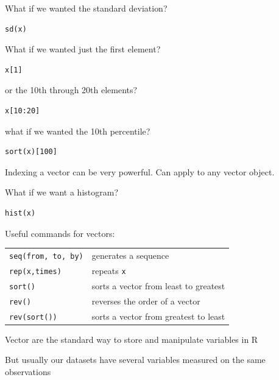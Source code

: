 \documentclass[pdflatex,landscape,titlepage]{foils}
\begin{document}
What if we wanted the standard deviation?

\begin{verbatim}
sd(x)
\end{verbatim}


What if we wanted just the first element?

\begin{verbatim}
x[1]
\end{verbatim}

or the 10th through 20th elements?

\begin{verbatim}
x[10:20]
\end{verbatim}

what if we wanted the 10th percentile?

\begin{verbatim}
sort(x)[100]
\end{verbatim}

Indexing a vector can be very powerful.  Can apply to any vector object.

What if we want a histogram?

\begin{verbatim}
hist(x)
\end{verbatim}


Useful commands for vectors:

\begin{tabular}{ll}
\texttt{seq(from, to, by)} &generates a sequence\\

\texttt{rep(x,times)} &repeats \texttt{x} \\

\texttt{sort()} &sorts a vector from least to greatest\\
  
\texttt{rev()} &reverses the order of a vector\\

\texttt{rev(sort())} &sorts a vector from greatest to least\\
\end{tabular}




Vector are the standard way to store and manipulate variables in R

But usually our datasets have several variables measured on the same observations
\end{document}
